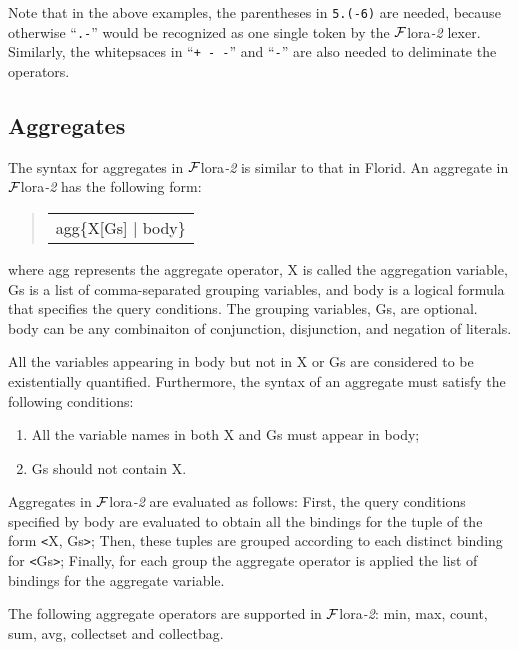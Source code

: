 \documentclass[11pt]{article}
\newenvironment{qrules}{\begin{quote}\sf\begin{tabular}[t]{l}}%
{\end{tabular}\end{quote}}
\newcommand{\FLORA}{{\mbox{${\cal F}${\sc lora}\rm\emph{-2}}}\xspace}
\newcommand{\FLORID}{{\mbox{\sc Florid}}\xspace}
\begin{document}
Note that in the above examples, the parentheses in {\tt 5.(-6)} are needed,
because otherwise ``{\tt .-}'' would be recognized as one single token by
the \FLORA lexer. Similarly, the whitepsaces in \mbox{``{\tt + - -}''} and
\mbox{``{\tt * -}''} are also needed to deliminate the operators.


\subsection{Aggregates}


The syntax for aggregates in \FLORA is similar to that in \FLORID. An
aggregate in \FLORA has the following form:
\begin{qrules}
agg\{X[Gs] $|$ body\}
\end{qrules}
%
where {\sf agg} represents the aggregate operator, {\sf X} is called the
aggregation variable, {\sf Gs} is a list of comma-separated grouping
variables, and {\sf body} is a logical formula that specifies the
query conditions. The grouping variables, {\sf Gs}, are optional. {\sf body}
can be any combinaiton of conjunction, disjunction, and negation of literals.

All the variables appearing in {\sf body} but not in {\sf X} or {\sf Gs} are
considered to be existentially quantified. Furthermore, the syntax of an
aggregate must satisfy the following conditions:
\begin{enumerate}
\item All the variable names in both {\sf X} and {\sf Gs} must
appear in {\sf body};
\item {\sf Gs} should not contain {\sf X}.
\end{enumerate}

Aggregates in \FLORA are evaluated as follows: First, the query
conditions specified by {\sf body} are evaluated to obtain all the bindings
for the tuple of the form {\sf \texttt{<}X, Gs\texttt{>}}; Then, these
tuples are grouped according to each distinct binding for
{\sf \texttt{<}Gs\texttt{>}}; Finally, for each group the aggregate operator
is applied the list of bindings for the aggregate variable.


%
The following aggregate operators are supported in \FLORA: {\sf min}, {\sf max},
{\sf count}, {\sf sum}, {\sf avg}, {\sf collectset} and {\sf collectbag}.
\end{document}
